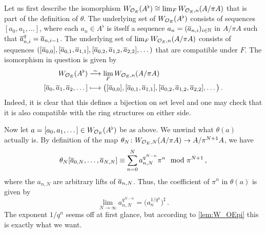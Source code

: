 \begin{proof*}
	Let us first describe the isomorphism $W_{\mathcal{O}_E}(A^\flat)\cong \operatorname*{lim}_FW_{\mathcal{O}_E,n}(A/\pi A)$ that is part of the definition of $\theta$. The underlying set of $W_{\mathcal{O}_E}(A^\flat)$ consists of sequences $[a_0,a_1,\dotsc]$, where each $a_n\in A^\flat$ is itself a sequence $a_n=(\ov{a}_{n,i})_{i\in\IN}$ in $A/\pi A$ such that $\ov{a}_{n,i}^q=\ov{a}_{n,i-1}$. The underlying set of $\operatorname*{lim}_FW_{\mathcal{O}_E,n}(A/\pi A)$ consists of sequences $([\ov{a}_{0,0}],[\ov{a}_{0,1},\ov{a}_{1,1}],[\ov{a}_{0,2},\ov{a}_{1,2},\ov{a}_{2,2}],\dotsc)$ that are compatible under $F$. The isomorphism in question is given by
	\begin{align*}
		W_{\Oo_E}(A^\flat)&\isomorphism\limit_FW_{\Oo_E,n}(A/\pi A)\\
		[\ov{a}_0,\ov{a}_1,\ov{a}_2,\dotsc]&\longmapsto \big([\ov{a}_{0,0}],[\ov{a}_{0,1},\ov{a}_{1,1}],[\ov{a}_{0,2},\ov{a}_{1,2},\ov{a}_{2,2}],\dotsc\big)\,.
	\end{align*}
	Indeed, it is clear that this defines a bijection on set level and one may check that it is also compatible with the ring structures on either side.
	
	Now let $a=[a_0,a_1,\dotsc]\in W_{\mathcal{O}_E}(A^\flat)$ be as above. We unwind what $\theta(a)$ actually is. By definition of the map $\theta_N\colon W_{\Oo_E,N}(A/\pi A)\morphism A/\pi^{N+1}A$, we have
	\begin{equation*}
		\theta_N[\ov{a}_{0,N},\dotsc,\ov{a}_{N,N}]\equiv\sum_{n=0}^Na_{n,N}^{q^{N-n}}\pi^n\mod \pi^{N+1}\,,
	\end{equation*}
	where the $a_{n,N}$ are arbitrary lifts of $\ov{a}_{n,N}$. 
	Thus, the coefficient of $\pi^n$ in $\theta(a)$ is given by
	\begin{equation*}
		\lim_{N\to\infty}a_{n,N}^{q^{N-n}}=\big(a_n^{1/q^n}\big)^\sharp\,.
	\end{equation*}
	The exponent $1/q^n$ seems off at first glance, but according to \cref{lem:W_OEpi} this is exactly what we want.
\end{proof*}
